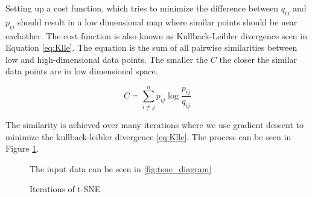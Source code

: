 Setting up a cost function, which tries to minimize the difference between $q_{ij}$ and $p_{ij}$ should result in a low dimensional map where similar points should be near eachother.
The cost function is also known as Kullback-Leibler divergence seen in Equation \ref{eq:Klle}. 
The equation is the sum of all pairwise similarities between low and high-dimensional data points.
The smaller the $C$ the closer the similar data points are in low dimensional space.

\begin{equation}
\label{eq:Klle}
 C = \sum_{i \neq j}^n p_{ij} \log \frac{p_{ij}}{q_{ij}}
\end{equation}

The similarity is achieved over many iterations where we use gradient descent to minimize the kullback-leibler divergence \ref{eq:Klle}. 
The process can be seen in Figure \ref{fig:tsne_iterations_arrows}.

\begin{figure}[H]
    \centering
    \caption{Iterations of t-SNE}
    \footnotesize{The input data can be seen in \ref{fig:tsne_diagram} }
	\label{fig:tsne_iterations_arrows}
\end{figure}


